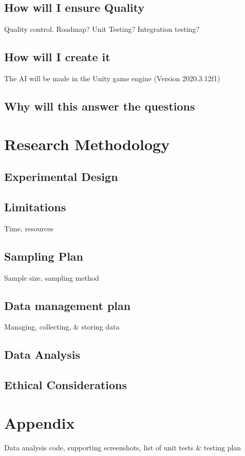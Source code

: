 \documentclass[journal]{IEEEtran}
\begin{document}
    \subsection{How will I ensure Quality}
        Quality control. Roadmap? Unit Testing? Integration testing?

    \subsection{How will I create it}
        The AI will be made in the Unity game engine (Version 2020.3.12f1)

    \subsection{Why will this answer the questions}

\section{Research Methodology}
    \subsection{Experimental Design}

    \subsection{Limitations}
        Time, resources

    \subsection{Sampling Plan}
        Sample size, sampling method

    \subsection{Data management plan}
        Managing, collecting, \& storing data

    \subsection{Data Analysis}

    \subsection{Ethical Considerations}

\section{Appendix}
    Data analysis code, supporting screenshots, list of unit tests \& testing plan



\end{document}
